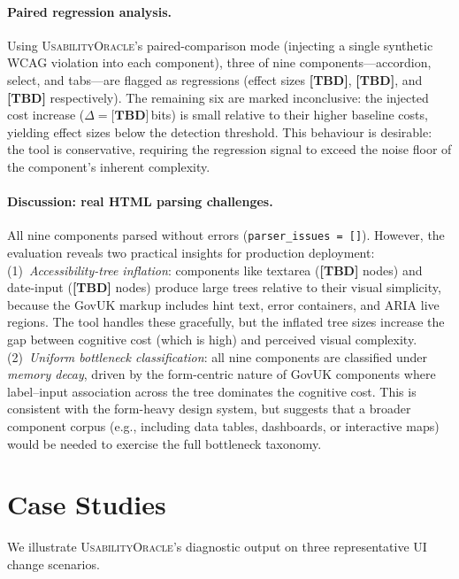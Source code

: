 \documentclass[11pt,twocolumn]{article}
\theoremstyle{definition}
\newcommand{\tool}{\textsc{UsabilityOracle}}
\begin{document}
\paragraph{Paired regression analysis.}
Using \tool{}'s paired-comparison mode (injecting a single synthetic WCAG violation into each component), three of nine components---accordion, select, and tabs---are flagged as regressions (effect sizes \textbf{[TBD]}, \textbf{[TBD]}, and \textbf{[TBD]} respectively).
The remaining six are marked inconclusive: the injected cost increase ($\Delta = \textbf{[TBD]}$\,bits) is small relative to their higher baseline costs, yielding effect sizes below the detection threshold.
This behaviour is desirable: the tool is conservative, requiring the regression signal to exceed the noise floor of the component's inherent complexity.

\paragraph{Discussion: real HTML parsing challenges.}
All nine components parsed without errors (\texttt{parser\_issues\,=\,[]}).
However, the evaluation reveals two practical insights for production deployment:
(1)~\emph{Accessibility-tree inflation}: components like textarea (\textbf{[TBD]} nodes) and date-input (\textbf{[TBD]} nodes) produce large trees relative to their visual simplicity, because the GovUK markup includes hint text, error containers, and ARIA live regions. The tool handles these gracefully, but the inflated tree sizes increase the gap between cognitive cost (which is high) and perceived visual complexity.
(2)~\emph{Uniform bottleneck classification}: all nine components are classified under \emph{memory decay}, driven by the form-centric nature of GovUK components where label--input association across the tree dominates the cognitive cost. This is consistent with the form-heavy design system, but suggests that a broader component corpus (e.g., including data tables, dashboards, or interactive maps) would be needed to exercise the full bottleneck taxonomy.

\section{Case Studies}
\label{sec:cases}

We illustrate \tool{}'s diagnostic output on three representative UI change scenarios.
\end{document}
